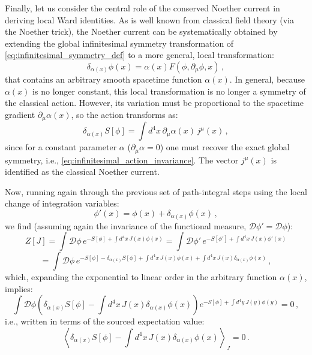 Finally, let us consider the central role of the conserved Noether current in deriving local Ward identities. As is well known from classical field theory (via the Noether trick), the Noether current can be systematically obtained by extending the global infinitesimal symmetry transformation of \eqref{eq:infinitesimal_symmetry_def} to a more general, local transformation:
\begin{equation} \label{eq:local_noether_transform}
    \delta_{\alpha(x)} \phi(x) = \alpha(x) F(\phi, \partial_\mu\phi, x) \, ,
\end{equation}
that contains an arbitrary smooth spacetime function \(\alpha(x)\). In general, because \(\alpha(x)\) is no longer constant, this local transformation is no longer a symmetry of the classical action. However, its variation must be proportional to the spacetime gradient \(\partial_\mu \alpha(x)\), so the action transforms as:
\begin{equation} \label{eq:action_variation_noether}
    \delta_{\alpha(x)} S[\phi] = \int d^4x \, \partial_\mu \alpha(x) \, j^\mu(x) \, ,
\end{equation}
since for a constant parameter \(\alpha\) (\(\partial_\mu \alpha = 0\)) one must recover the exact global symmetry, i.e., \eqref{eq:infinitesimal_action_invariance}. The vector \(j^\mu(x)\) is identified as the classical Noether current.

Now, running again through the previous set of path-integral steps using the local change of integration variables:
\begin{equation} \label{eq:local_field_redef}
    \phi'(x) = \phi(x) + \delta_{\alpha(x)} \phi(x) \, ,
\end{equation}
we find (assuming again the invariance of the functional measure, \(\mathcal{D}\phi' = \mathcal{D}\phi\)):
\begin{equation} \label{eq:z_local_shift_1}
    Z[J] = \int \mathcal{D}\phi \, e^{-S[\phi] + \int d^4x \, J(x)\phi(x)} = \int \mathcal{D}\phi' \, e^{-S[\phi'] + \int d^4x \, J(x)\phi'(x)}
\end{equation}
\begin{equation} \label{eq:z_local_shift_2}
    = \int \mathcal{D}\phi \, e^{-S[\phi] - \delta_{\alpha(x)}S[\phi] + \int d^4x \, J(x)\phi(x) + \int d^4x \, J(x)\delta_{\alpha(x)}\phi(x)} \, ,
\end{equation}
which, expanding the exponential to linear order in the arbitrary function \(\alpha(x)\), implies:
\begin{equation} \label{eq:local_ward_integral}
    \int \mathcal{D}\phi \left( \delta_{\alpha(x)}S[\phi] - \int d^4x \, J(x) \delta_{\alpha(x)}\phi(x) \right) e^{-S[\phi] + \int d^4y \, J(y)\phi(y)} = 0 \, ,
\end{equation}
i.e., written in terms of the sourced expectation value:
\begin{equation} \label{eq:local_ward_expectation}
    \left\langle \delta_{\alpha(x)}S[\phi] - \int d^4x \, J(x) \delta_{\alpha(x)}\phi(x) \right\rangle_J = 0 \, .
\end{equation}

